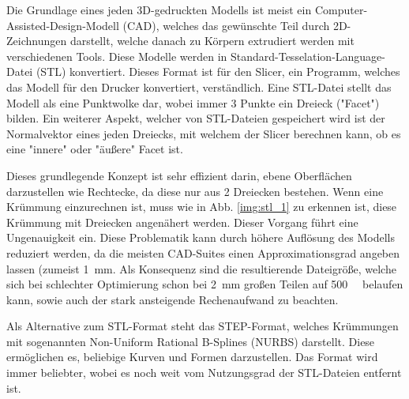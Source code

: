 \documentclass[../main.tex]{subfiles}
\begin{document}
Die Grundlage eines jeden 3D-gedruckten Modells ist meist ein Computer-Assisted-Design-Modell (CAD), welches das gewünschte Teil durch 2D-Zeichnungen darstellt, welche danach zu Körpern extrudiert werden mit verschiedenen Tools. Diese Modelle werden  in Standard-Tesselation-Language-Datei (STL) konvertiert. Dieses Format ist für den Slicer, ein Programm, welches das Modell für den Drucker konvertiert, verständlich. Eine STL-Datei stellt das Modell als eine Punktwolke dar, wobei immer 3 Punkte ein Dreieck ("Facet") bilden. Ein weiterer Aspekt, welcher von STL-Dateien gespeichert wird ist der Normalvektor eines jeden Dreiecks, mit welchem der Slicer berechnen kann, ob es eine "innere" oder "äußere"
Facet ist.


Dieses grundlegende Konzept ist sehr effizient darin, ebene Oberflächen darzustellen wie Rechtecke, da diese nur aus 2 Dreiecken bestehen. Wenn eine Krümmung einzurechnen ist, muss wie in Abb. \ref{img:stl_1} zu erkennen ist, diese Krümmung mit Dreiecken angenähert werden. Dieser Vorgang führt eine Ungenauigkeit ein. Diese Problematik kann durch höhere Auflösung des Modells reduziert werden, da die meisten CAD-Suites einen Approximationsgrad angeben lassen (zumeist \qty{1}{\milli\meter}. Als Konsequenz sind die resultierende Dateigröße, welche sich bei schlechter Optimierung schon bei \qty{2}{\milli\meter} großen Teilen auf \qty{500}{\mega\byte} belaufen kann, sowie auch der stark ansteigende Rechenaufwand zu beachten. \parencite{ADOBLESTL} 

Als Alternative zum STL-Format steht das STEP-Format, welches Krümmungen mit sogenannten Non-Uniform Rational B-Splines (NURBS) darstellt.
Diese ermöglichen es, beliebige Kurven und Formen darzustellen. Das Format wird immer beliebter, wobei es noch weit vom Nutzungsgrad der STL-Dateien entfernt ist. \parencite{ADOBESTEP}
\end{document}
